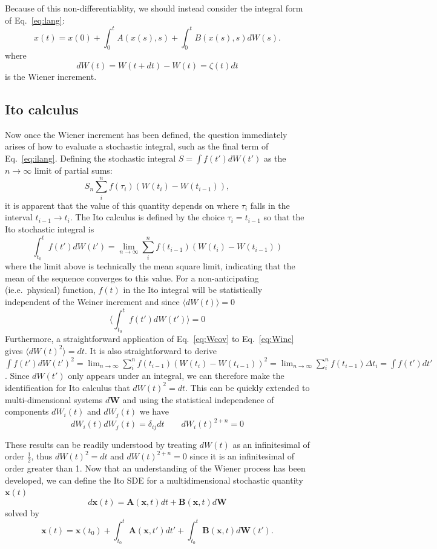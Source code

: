 \documentclass[notitlepage,pra,10pt,aps]{revtex4-2}
\newcommand {\be}{\begin{equation}}
\newcommand {\ee}{\end{equation}}
\newcommand{\expect}[1]{\langle#1\rangle}
\begin{document}
Because of this non-differentiablity, we should instead consider the integral form of  Eq.~\eqref{eq:lang}:
\be
x(t)=x(0)+\int_0^t A(x(s), s)+\int_0^t B(x(s), s) dW(s). \label{eq:ilang}
\ee
where
\be
dW(t)=W(t+dt)-W(t)=\zeta(t)dt \label{eq:Winc}
\ee
is the Wiener increment.

\subsection{Ito calculus}
Now once the Wiener increment has been defined, the question immediately arises of how to evaluate a stochastic integral, such as the final term of Eq.~\eqref{eq:ilang}.  Defining the stochastic integral $S=\int f(t')dW(t')$ as the $n\to\infty$ limit of partial sums:
\be
S_n\sum_i^n f(\tau_i)\left(W(t_i)-W(t_{i-1})\right),
\ee
it is apparent that the value of this quantity depends on where $\tau_i$ falls in the interval $t_{i-1}\to t_i$.  The Ito calculus is defined by the choice $\tau_i=t_{i-1}$ so that the Ito stochastic integral is
\be
\int_{t_0}^t f(t')dW(t')=\lim_{n\to\infty} \sum_i^n f(t_{i-1})\left(W(t_i)-W(t_{i-1})\right) \label{eq:ItoInt}
\ee
where the limit above is technically the mean square limit, indicating that the mean of the sequence converges to this value.  For a non-anticipating (ie.e.~physical) function, $f(t)$ in the Ito integral will be statistically independent of the Weiner increment and since  $\expect{dW(t)}=0$
\be
\expect{\int_{t_0}^t f(t')dW(t')}=0 \label{eq:meandw}
\ee
Furthermore, a straightforward application of Eq.~\eqref{eq:Wcov} to Eq.~\eqref{eq:Winc} gives $\expect{dW(t)^2}=dt$. It is also straightforward to derive $\int f(t') dW(t')^2=\lim_{n\to\infty} \sum_i^n f(t_{i-1})\left(W(t_i)-W(t_{i-1})\right)^2=\lim_{n\to\infty} \sum_i^n f(t_{i-1})\Delta t_i=\int f(t') dt'$.     Since $dW(t')$ only appears under an integral, we can therefore make the identification for Ito calculus that
$
dW(t)^2=dt
$.  This can be quickly extended to multi-dimensional systems $d\mathbf{W}$ and using the statistical independence of components $dW_i(t)$ and $dW_j(t)$ we have
  \be
  dW_i(t)dW_j(t)=\delta_{ij}dt \quad \quad
  dW_i(t)^{2+n}=0  \label{eq:dw2}
  \ee

These results can be readily understood by treating $dW(t)$ as an infinitesimal of order $\frac{1}{2}$, thus  $dW(t)^2=dt$ and $dW(t)^{2+n}=0$ since it is an infinitesimal of order greater than 1.  Now that an understanding of the Wiener process has been developed, we can define the Ito SDE for a multidimensional stochastic quantity $\mathbf{x}(t)$
\be
d\mathbf{x}(t)=\mathbf{A}(\mathbf{x}, t)dt+\mathbf{B}(\mathbf{x}, t)d\mathbf{W}
\ee
solved by
\be
\mathbf{x}(t)=\mathbf{x}(t_0)+\int_{t_0}^t \mathbf{A}(\mathbf{x}, t')dt'+\int_{t_0}^t \mathbf{B}(\mathbf{x}, t)d\mathbf{W}(t').\label{eq:intsde}
\ee
\end{document}
